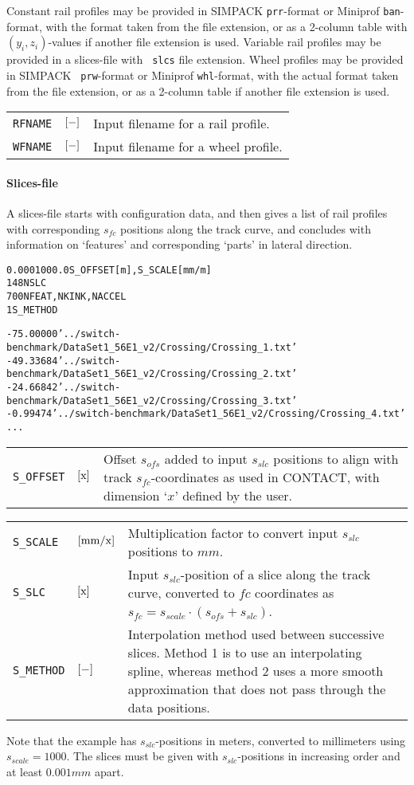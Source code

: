 \documentclass[12pt]{report}
\newenvironment{inputvars}{\vspace{0.4\baselineskip}%

\begin{tabular}{>{\raggedright}p{22mm}p{19mm}p{113mm}}}{
\end{tabular}

}
\newcommand{\inpvar}[3]{{\small\tt #1} & $#2$ & #3 \\[1ex]}
\newcommand{\inpbreak}{\end{inputvars}\begin{inputvars}}
\begin{document}
Constant rail profiles may be provided in SIMPACK {\tt prr}-format or Miniprof
{\tt ban}-format, with the format taken from the file extension, or as a
2-column table with $(y_i,z_i)$-values if another file extension is used.
Variable rail profiles may be provided in a slices-file with {\tt
slcs} file extension. Wheel profiles may be provided in SIMPACK {\tt 
prw}-format or Miniprof {\tt whl}-format, with the actual format taken
from the file extension, or as a 2-column table if another file extension
is used.
\begin{inputvars}
\inpvar{RFNAME}{\bunit{-}}{Input filename for a rail profile.}
\inpvar{WFNAME}{\bunit{-}}{Input filename for a wheel profile.}
\end{inputvars}

\paragraph{Slices-file}

A slices-file starts with configuration data, and then gives a list of
rail profiles with corresponding $s_{fc}$ positions along the track curve,
and concludes with information on `features' and corresponding `parts'
in lateral direction.
\begin{alltt}\small
% data for S+C benchmark, UK crossing '56E1-R245-1:9.25'

   0.000    1000.0   S_OFFSET [m], S_SCALE [mm/m]
     148             NSLC
       7    0    0   NFEAT, NKINK, NACCEL
       1             S_METHOD

%  - slice positions S_SLC [m] and filenames RFNAME per slice

 -75.00000   '../switch-benchmark/DataSet1_56E1_v2/Crossing/Crossing_1.txt'
 -49.33684   '../switch-benchmark/DataSet1_56E1_v2/Crossing/Crossing_2.txt'
 -24.66842   '../switch-benchmark/DataSet1_56E1_v2/Crossing/Crossing_3.txt'
  -0.99474   '../switch-benchmark/DataSet1_56E1_v2/Crossing/Crossing_4.txt'
          ...
\end{alltt}
\begin{inputvars}
\inpvar{S\_OFFSET}{\bunit{x}}{Offset $s_{ofs}$ added to input $s_{slc}$
        positions to align with track $s_{fc}$-coordinates as used in
        CONTACT, with dimension `$\unit{x}$' defined by the user.}
\inpbreak
\inpvar{S\_SCALE}{\bunit{mm/x}}{Multiplication factor to convert input
        $s_{slc}$ positions to $\unit{mm}$.}
\inpvar{S\_SLC}{\bunit{x}}{Input $s_{slc}$-position of a slice along the
        track curve, converted to $fc$ coordinates as $s_{fc} = s_{scale}
        \cdot (s_{ofs} + s_{slc})$.}
\inpvar{S\_METHOD}{\bunit{-}}{Interpolation method used between successive
        slices. Method 1 is to use an interpolating spline, whereas method
        2 uses a more smooth approximation that does not pass through the
        data positions.}
\end{inputvars}
Note that the example has $s_{slc}$-positions in meters, converted to
millimeters using $s_{scale}=1000$. The slices must be given with
$s_{slc}$-positions in increasing order and at least $0.001\unit{mm}$ apart.
\end{document}
